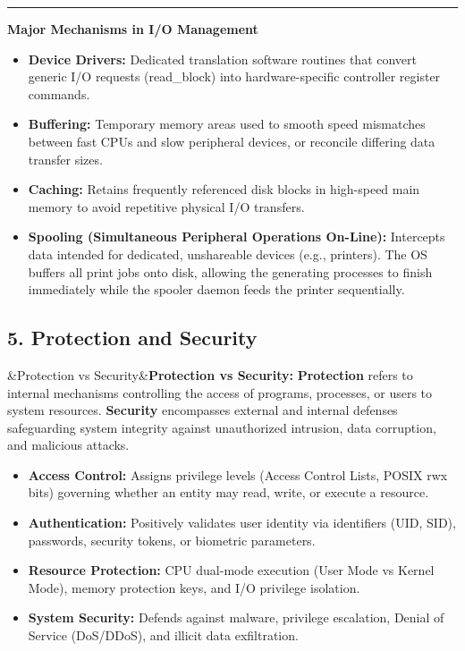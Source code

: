 \documentclass[11pt,a4paper]{article}
\newcommand{\ic}[1]{\mbox{\colorbox{AnthCodeBG}{\footnotesize\ttfamily\textcolor{AnthBlue}{#1}}}}
\newcommand{\concept}[1]{%
  \noindent\textcolor{AnthGreen}{\rule{3pt}{10pt}}\enspace
  \textbf{\color{AnthDark}#1}\par\vspace{2pt}%
}
\newenvironment{Def}[1][]{\begin{tcolorbox}[defbox]\ifx&#1&\else\textbf{#1:}\enspace\fi}{\end{tcolorbox}}
\begin{document}
\concept{Major Mechanisms in I/O Management}
\begin{itemize}
    \item \textbf{Device Drivers:} Dedicated translation software routines that convert generic I/O requests (\ic{read\_block}) into hardware-specific controller register commands.
    \item \textbf{Buffering:} Temporary memory areas used to smooth speed mismatches between fast CPUs and slow peripheral devices, or reconcile differing data transfer sizes.
    \item \textbf{Caching:} Retains frequently referenced disk blocks in high-speed main memory to avoid repetitive physical I/O transfers.
    \item \textbf{Spooling (Simultaneous Peripheral Operations On-Line):} Intercepts data intended for dedicated, unshareable devices (e.g., printers). The OS buffers all print jobs onto disk, allowing the generating processes to finish immediately while the spooler daemon feeds the printer sequentially.
\end{itemize}

\subsection{5. Protection and Security}

\begin{Def}[Protection vs Security]
\textbf{Protection} refers to internal mechanisms controlling the access of programs, processes, or users to system resources. \textbf{Security} encompasses external and internal defenses safeguarding system integrity against unauthorized intrusion, data corruption, and malicious attacks.
\end{Def}

\begin{itemize}
    \item \textbf{Access Control:} Assigns privilege levels (Access Control Lists, POSIX \ic{rwx} bits) governing whether an entity may read, write, or execute a resource.
    \item \textbf{Authentication:} Positively validates user identity via identifiers (UID, SID), passwords, security tokens, or biometric parameters.
    \item \textbf{Resource Protection:} CPU dual-mode execution (User Mode vs Kernel Mode), memory protection keys, and I/O privilege isolation.
    \item \textbf{System Security:} Defends against malware, privilege escalation, Denial of Service (DoS/DDoS), and illicit data exfiltration.
\end{itemize}
\end{document}
